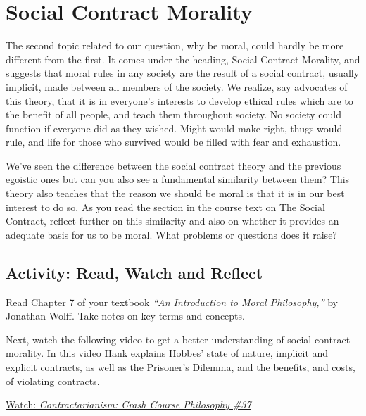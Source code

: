 \documentclass[
]{book}
\begin{document}
\hypertarget{social-contract-morality}{%
\section{Social Contract Morality}\label{social-contract-morality}}

The second topic related to our question, why be moral, could hardly be more different from the first. It comes under the heading, Social Contract Morality, and suggests that moral rules in any society are the result of a social contract, usually implicit, made between all members of the society. We realize, say advocates of this theory, that it is in everyone's interests to develop ethical rules which are to the benefit of all people, and teach them throughout society. No society could function if everyone did as they wished. Might would make right, thugs would rule, and life for those who survived would be filled with fear and exhaustion.

We've seen the difference between the social contract theory and the previous egoistic ones but can you also see a fundamental similarity between them? This theory also teaches that the reason we should be moral is that it is in our best interest to do so. As you read the section in the course text on The Social Contract, reflect further on this similarity and also on whether it provides an adequate basis for us to be moral. What problems or questions does it raise?

\hypertarget{activity-read-watch-and-reflect-4}{%
\subsection*{Activity: Read, Watch and Reflect}\label{activity-read-watch-and-reflect-4}}

\begin{reflect}
Read Chapter 7 of your textbook \emph{``An Introduction to Moral Philosophy,''} by Jonathan Wolff. Take notes on key terms and concepts.

Next, watch the following video to get a better understanding of social contract morality. In this video Hank explains Hobbes' state of nature, implicit and explicit contracts, as well as the Prisoner's Dilemma, and the benefits, and costs, of violating contracts.

\href{https://www.youtube.com/watch?v=2Co6pNvd9mc}{Watch: \emph{Contractarianism: Crash Course Philosophy \#37}}
\end{reflect}
\end{document}
